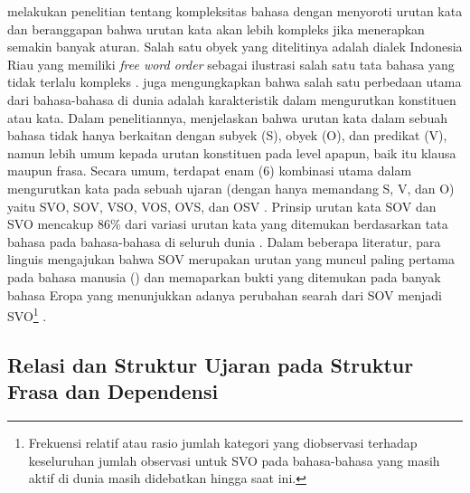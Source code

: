 \cite{gil2001creoles} melakukan penelitian tentang kompleksitas bahasa dengan menyoroti urutan kata dan beranggapan bahwa urutan kata akan lebih kompleks jika menerapkan semakin banyak aturan. Salah satu obyek yang ditelitinya adalah dialek Indonesia Riau yang memiliki \textit{free word order} sebagai ilustrasi salah satu tata bahasa yang tidak terlalu kompleks \citep{gil2001creoles}. \cite{dryer2007word} juga mengungkapkan bahwa salah satu perbedaan utama dari bahasa-bahasa di dunia adalah karakteristik dalam mengurutkan konstituen atau kata. Dalam penelitiannya, \cite{dryer2007word} menjelaskan bahwa urutan kata dalam sebuah bahasa tidak hanya berkaitan dengan subyek (S), obyek (O), dan predikat (V), namun lebih umum kepada urutan konstituen pada level apapun, baik itu klausa maupun frasa. Secara umum, terdapat enam (6) kombinasi utama dalam mengurutkan kata pada sebuah ujaran (dengan hanya memandang S, V, dan O) yaitu SVO, SOV, VSO, VOS, OVS, dan OSV \cite{dryer2007word}. Prinsip urutan kata SOV dan SVO mencakup 86\% dari variasi urutan kata yang ditemukan berdasarkan tata bahasa pada bahasa-bahasa di seluruh dunia \citep{dryer2005world}. Dalam beberapa literatur, para linguis mengajukan bahwa SOV merupakan urutan yang muncul paling pertama pada bahasa manusia (\citealp{givon1979syntax, gell2011origin, newmeyer2000language}) dan memaparkan bukti yang ditemukan pada banyak bahasa Eropa yang menunjukkan adanya perubahan searah dari SOV menjadi SVO\footnote{Frekuensi relatif atau rasio jumlah kategori yang diobservasi terhadap keseluruhan jumlah observasi untuk SVO pada bahasa-bahasa yang masih aktif di dunia masih didebatkan hingga saat ini.} \citep{newmeyer2000language}. 
 
\subsection{Relasi dan Struktur Ujaran pada Struktur Frasa dan Dependensi}

